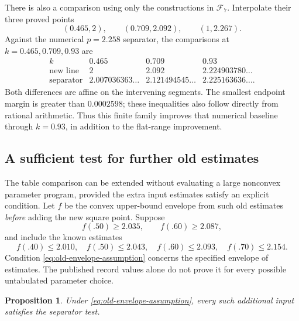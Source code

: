 \documentclass[11pt]{article}
\numberwithin{equation}{section}
\newtheorem{proposition}[theorem]{Proposition}
\theoremstyle{definition}
\theoremstyle{remark}
\newcommand{\calF}{\mathcal F}
\begin{document}
There is also a comparison using only the constructions in
\(\calF_7\).  Interpolate their three proved points
\[
 (0.465,2),\qquad(0.709,2.092),\qquad(1,2.267).
\]
Against the numerical \(p=2.258\) separator, the comparisons at
\(k=0.465,0.709,0.93\) are
\[
\begin{array}{c|ccc}
k&0.465&0.709&0.93\\ \hline
\text{new line}&2&2.092&2.224903780\ldots\\
\text{separator}&2.007036363\ldots&2.121494545\ldots&
 2.225163636\ldots .
\end{array}
\]
Both differences are affine on the intervening segments.
The smallest endpoint margin is greater than \(0.0002598\);
these inequalities also follow directly from rational arithmetic.
Thus this finite family improves that numerical baseline through
\(k=0.93\), in addition to the flat-range improvement.

\subsection{A sufficient test for further old estimates}

The table comparison can be extended without evaluating a large
nonconvex parameter program, provided the extra input estimates
satisfy an explicit condition.
Let \(f\) be the convex upper-bound envelope from such old estimates
\emph{before} adding the new square point.
Suppose
\begin{equation}\label{eq:old-envelope-assumption}
 f(.50)\ge2.035,\qquad f(.60)\ge2.087,
\end{equation}
and include the known estimates
\[
 f(.40)\le2.010,\quad f(.50)\le2.043,\quad
 f(.60)\le2.093,\quad f(.70)\le2.154.
\]
Condition \eqref{eq:old-envelope-assumption} concerns the specified
envelope of estimates.  The published record values alone do not
prove it for every possible untabulated parameter choice.

\begin{proposition}\label{prop:extra-inputs}
Under \eqref{eq:old-envelope-assumption}, every such additional input
satisfies the separator test.
\end{proposition}
\end{document}
